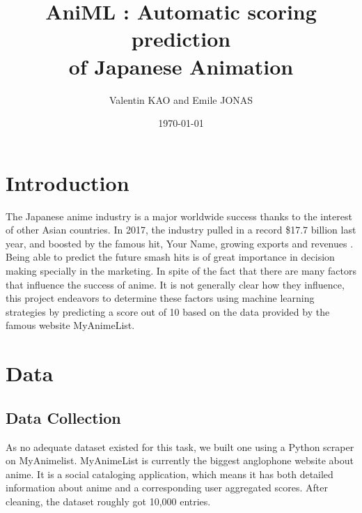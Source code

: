\documentclass[final]{beamer}
\title
[Final Presentation for ML Course, June 2018, Beijing]
{ %
AniML : Automatic scoring prediction \\
of Japanese Animation
}
\author{
Valentin KAO and Emile JONAS
}
\institute{Department of Computer Sciences\\
Tsinghua University\\
}
\date{\today}
\begin{document}
\begin{frame}[t]
\begin{multicols}{3}

\section{Introduction}
The Japanese anime industry is a major worldwide success thanks to the interest of other Asian countries. In 2017, the industry pulled in a record \$17.7 billion last year, and boosted by the famous hit, Your Name, growing exports and revenues \cite{web1}. \\
Being able to predict the future smash hits is of great importance in decision making specially in the marketing. In spite of the fact that there are many factors that influence the success of anime. It is not generally clear how they influence, this project endeavors to determine these factors using machine learning strategies by predicting a score out of 10 based on the data provided by the famous website MyAnimeList. \\




\section{Data}

\subsection{Data Collection}
As no adequate dataset existed for this task, we built one using a Python scraper on MyAnimelist. MyAnimeList is currently the biggest anglophone website about anime. It is a social cataloging application, which means it has both detailed information about anime and a corresponding user aggregated scores. After cleaning, the dataset roughly got 10,000 entries.



\end{multicols}
\end{frame}
\end{document}

